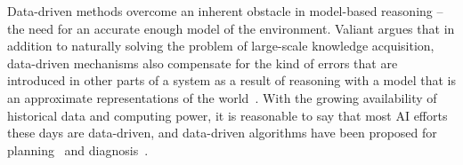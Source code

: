 \documentclass[12pt]{article}
\newcommand{\note}[1]{\textbf{\textit{#1}}}
\begin{document}
Data-driven methods overcome an inherent obstacle in model-based reasoning -- the need for an accurate enough model of the environment. Valiant
argues that in addition to naturally solving the problem of large-scale knowledge acquisition, data-driven mechanisms also compensate for the kind of errors that 
are introduced in other parts of a system as a result of  reasoning with a model that is an approximate representations of the world~\cite{valiant2000neuroidal,valiant2000robustLogics}. With the growing availability of historical data and computing power, it is reasonable to say that most AI efforts these days are data-driven,
and data-driven algorithms have been proposed for  planning~\cite{fern2011first,juba2016jmlr} and diagnosis~\cite{keren2011model,qin2012survey}.





\end{document}
